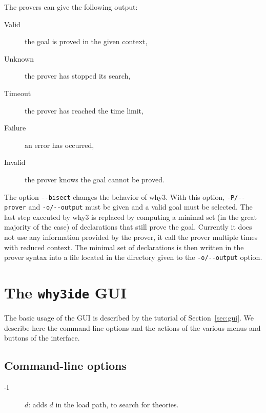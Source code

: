 
\noindent
The provers can give the following output:
\begin{description}
\item[Valid] the goal is proved in the given context,
\item[Unknown] the prover has stopped its search,
\item[Timeout] the prover has reached the time limit,
\item[Failure] an error has occurred,
\item[Invalid] the prover knows the goal cannot be proved.
\end{description}

The option \verb|--bisect| changes the behavior of why3. With this
option, \verb|-P/--prover| and \verb|-o/--output| must be given
and a valid goal must be selected. The last step executed by why3 is
replaced by computing a minimal set (in the great majority of the
case) of declarations that still prove the goal. Currently it does not
use any information provided by the prover, it call the prover
multiple times with reduced context. The minimal set of declarations is
then written in the prover syntax into a file located in the directory
given to the \verb|-o/--output| option.

\section{The \texttt{why3ide} GUI}
\label{sec:ideref}

The basic usage of the GUI is described by the tutorial of
Section~\ref{sec:gui}. We describe here the command-line options and
the actions of the various menus and buttons of the interface.

\subsection{Command-line options}

\begin{description}
\item[-I] $d$: adds $d$ in the load path, to search for theories.
\end{description}

